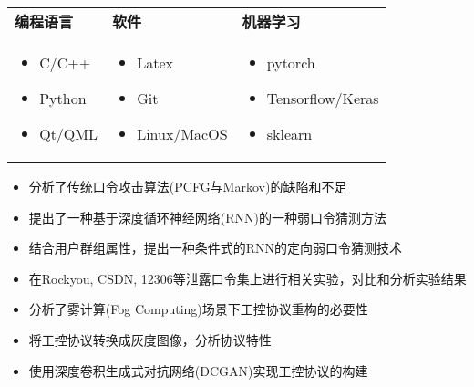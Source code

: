 ﻿\documentclass{resume}
\author{陆\ \ 楚}
\begin{document}
\maketitle

\TechnicalSkills
\begin{table}[H]
	\centering
	\begin{tabularx}{\textwidth}{X X X}
         \textbf{编程语言} & \textbf{软件}  & \textbf{机器学习}\\
		\begin{itemize}
			\item C/C++
			\item Python
			\item Qt/QML
		\end{itemize} &
		\begin{itemize}
			\item Latex 
			\item Git
			\item Linux/MacOS
		\end{itemize} &
        \begin{itemize}
            \item pytorch
            \item Tensorflow/Keras
            \item sklearn
        \end{itemize}
	\end{tabularx}
\end{table}
\vspace{-4em} %
\Education



\TechnicalProjects
\begin{itemize}
	\item 分析了传统口令攻击算法(PCFG与Markov)的缺陷和不足
	\item 提出了一种基于深度循环神经网络(RNN)的一种弱口令猜测方法
    \item 结合用户群组属性，提出一种条件式的RNN的定向弱口令猜测技术
    \item 在Rockyou, CSDN, 12306等泄露口令集上进行相关实验，对比和分析实验结果
\end{itemize}

\begin{itemize}
	\item 分析了雾计算(Fog Computing)场景下工控协议重构的必要性
	\item 将工控协议转换成灰度图像，分析协议特性
	\item 使用深度卷积生成式对抗网络(DCGAN)实现工控协议的构建
\end{itemize}
\end{document}
